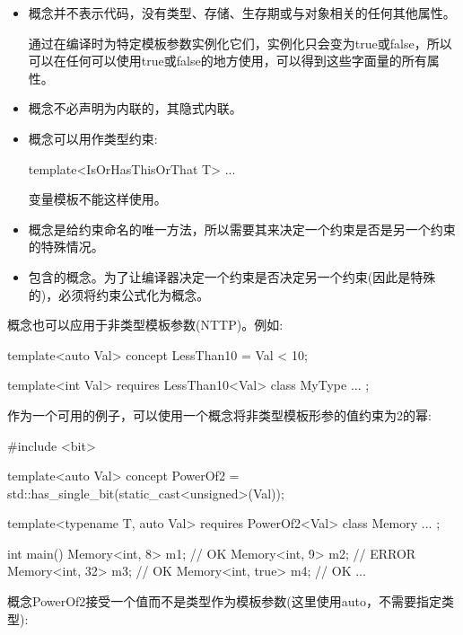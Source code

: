 \begin{itemize}
\item
概念并不表示代码，没有类型、存储、生存期或与对象相关的任何其他属性。

通过在编译时为特定模板参数实例化它们，实例化只会变为true或false，所以可以在任何可以使用true或false的地方使用，可以得到这些字面量的所有属性。

\item
概念不必声明为内联的，其隐式内联。

\item
概念可以用作类型约束:

\begin{cpp}
template<IsOrHasThisOrThat T>
...
\end{cpp}

变量模板不能这样使用。

\item
概念是给约束命名的唯一方法，所以需要其来决定一个约束是否是另一个约束的特殊情况。

\item
包含的概念。为了让编译器决定一个约束是否决定另一个约束(因此是特殊的)，必须将约束公式化为概念。
\end{itemize}


概念也可以应用于非类型模板参数(NTTP)。例如:

\begin{cpp}
template<auto Val>
concept LessThan10 = Val < 10;

template<int Val>
requires LessThan10<Val>
class MyType {
	...
};
\end{cpp}

作为一个可用的例子，可以使用一个概念将非类型模板形参的值约束为2的幂:


\begin{cpp}
#include <bit>

template<auto Val>
concept PowerOf2 = std::has_single_bit(static_cast<unsigned>(Val));

template<typename T, auto Val>
requires PowerOf2<Val>
class Memory {
	...
};

int main()
{
	Memory<int, 8> m1; // OK
	Memory<int, 9> m2; // ERROR
	Memory<int, 32> m3; // OK
	Memory<int, true> m4; // OK
	...
}
\end{cpp}

概念PowerOf2接受一个值而不是类型作为模板参数(这里使用auto，不需要指定类型):

